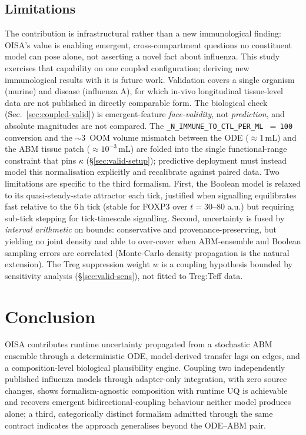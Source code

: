 \documentclass[conference,letterpaper,10pt]{IEEEtran}
\begin{document}
\subsection{Limitations}
The contribution is infrastructural rather than a new immunological
finding: OISA's value is enabling emergent, cross-compartment questions no
constituent model can pose alone, not asserting a novel fact about
influenza. This study exercises that capability on one coupled
configuration; deriving new immunological results with it is future work.
Validation covers a single organism (murine) and disease (influenza A),
for which in-vivo longitudinal tissue-level data are not published in
directly comparable form. The biological check
(Sec.~\ref{sec:coupled-valid}) is emergent-feature \emph{face-validity}, not
\emph{prediction}, and absolute magnitudes are not compared. The
\texttt{\_N\_IMMUNE\_TO\_CTL\_PER\_ML\,$=\,$100} conversion and the
$\sim$3~OOM volume mismatch between the ODE ($\approx$1\,mL) and the ABM
tissue patch ($\approx\!10^{-3}$\,mL) are folded into the single
functional-range constraint that pins $\kappa$ (\S\ref{sec:valid-setup});
predictive deployment must instead model this normalisation explicitly and
recalibrate against paired data. Two limitations are specific to the third
formalism. First, the Boolean model is relaxed to its quasi-steady-state
attractor each tick, justified when signalling equilibrates fast relative to
the 6\,h tick (stable for FOXP3 over $t=30$--$80$ a.u.) but requiring
sub-tick stepping for tick-timescale signalling. Second, uncertainty is fused
by \emph{interval arithmetic} on bounds: conservative and
provenance-preserving, but yielding no joint density and able to over-cover
when ABM-ensemble and Boolean sampling errors are correlated (Monte-Carlo
density propagation is the natural extension). The Treg suppression weight $w$
is a coupling hypothesis bounded by sensitivity analysis
(\S\ref{sec:valid-sens}), not fitted to Treg:Teff data.


\section{Conclusion}
OISA contributes runtime uncertainty propagated from a stochastic ABM
ensemble through a deterministic ODE, model-derived transfer lags on edges,
and a composition-level biological plausibility engine. Coupling two
independently published influenza models through adapter-only integration,
with zero source changes, shows formalism-agnostic composition with runtime UQ
is achievable and recovers emergent bidirectional-coupling behaviour neither
model produces alone; a third, categorically distinct formalism admitted
through the same contract indicates the approach generalises beyond the
ODE--ABM pair.
\end{document}
